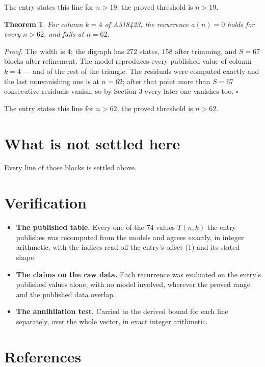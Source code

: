 \documentclass[11pt]{article}
\newtheorem{theorem}{Theorem}
\theoremstyle{definition}
\begin{document}
The entry states this line for $n > 19$; the proved threshold is $n > 19$.

\begin{theorem} For column $k = 4$ of A318423, the recurrence $a(n) = 0$ holds for every $n > 62$, and fails at $n = 62$.\end{theorem}

{\itshape Proof.} The width is $4$; the digraph has $272$ states, $158$ after trimming, and $S = 67$ blocks after refinement. The model reproduces every published value of column $k = 4$ --- and of the rest of the triangle. The residuals were computed exactly and the last nonvanishing one is at $n = 62$; after that point more than $S = 67$ consecutive residuals vanish, so by Section 3 every later one vanishes too. $\square$

The entry states this line for $n > 62$; the proved threshold is $n > 62$.

\section{What is not settled here}

Every line of those blocks is settled above.

\section{Verification}

\begin{itemize}

\item {\bfseries The published table.} Every one of the 74 values $T(n,k)$ the entry publishes was recomputed from the models and agrees exactly, in integer arithmetic, with the indices read off the entry's offset (1) and its stated shape.

\item {\bfseries The claims on the raw data.} Each recurrence was evaluated on the entry's published values alone, with no model involved, wherever the proved range and the published data overlap.

\item {\bfseries The annihilation test.} Carried to the derived bound for each line separately, over the whole vector, in exact integer arithmetic.

\end{itemize}

\section{References}
\end{document}
